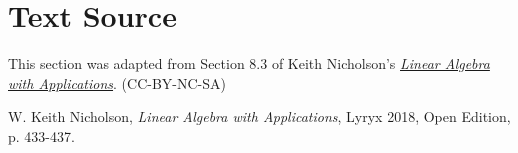 \documentclass{ximera}
\begin{document}
\section*{Text Source} This section was adapted from Section 8.3 of Keith Nicholson's \href{https://open.umn.edu/opentextbooks/textbooks/linear-algebra-with-applications}{\it Linear Algebra with Applications}. (CC-BY-NC-SA)

W. Keith Nicholson, {\it Linear Algebra with Applications}, Lyryx 2018, Open Edition, p. 433-437.
\end{document}
